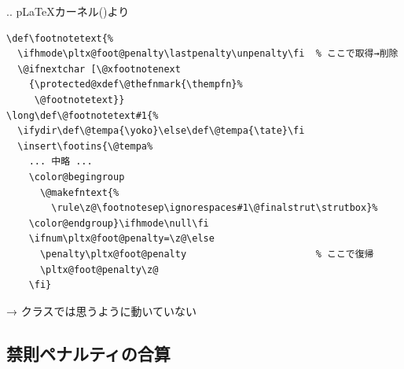 \documentclass[a5paper,dvipdfmx,14pt]{beamer}
\def\cs#1{\texttt{\char92\nobreak#1}}
\def\pTeX{p\kern-.15em\TeX}
\def\pLaTeX{p\LaTeX}
\begin{document}
\begin{frame}[t,fragile]{\insertsectionnumber.\insertsubsectionnumber. \insertsubsection}{}
{\small {\SUSHI} \pLaTeX カーネル()より {\SUSHI}}
{\scriptsize
\begin{verbatim}
\def\footnotetext{%
  \ifhmode\pltx@foot@penalty\lastpenalty\unpenalty\fi  % ここで取得→削除
  \@ifnextchar [\@xfootnotenext
    {\protected@xdef\@thefnmark{\thempfn}%
     \@footnotetext}}
\long\def\@footnotetext#1{%
  \ifydir\def\@tempa{\yoko}\else\def\@tempa{\tate}\fi
  \insert\footins{\@tempa%
    ... 中略 ...
    \color@begingroup
      \@makefntext{%
        \rule\z@\footnotesep\ignorespaces#1\@finalstrut\strutbox}%
    \color@endgroup}\ifhmode\null\fi
    \ifnum\pltx@foot@penalty=\z@\else
      \penalty\pltx@foot@penalty                       % ここで復帰
      \pltx@foot@penalty\z@
    \fi}
\end{verbatim}
}
{\small
→ クラスでは思うように動いていない\SUSHI\par
{}\par
}
\end{frame}

\subsection{禁則ペナルティの合算}

\def\ruleKINSOKUadd{%
\begin{tcolorbox}[colframe=black!70!blue,colback=white!90!blue,
  coltitle=white,fonttitle=\small\bfseries,
  title=\pTeX の禁則ペナルティ挿入]
\begin{itemize}\footnotesize\leftskip-18pt
  \item \cs{prebreakpenalty}は，既にその位置にペナルティがあれば
    それに\COLOREMPH{合算}する形で発行される（別には発行されない）．
  \item \cs{postbreakpenalty}は，直後に（\cs{prebreakpenalty}以外の）
    ペナルティが来ても合算されず，常に\COLOREMPH{別々}に発行される．
\end{itemize}
\end{tcolorbox}}
\end{document}
